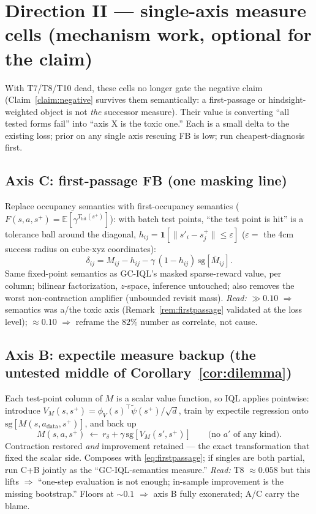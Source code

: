 \documentclass[11pt]{article}
\newcommand{\E}{\mathbb{E}}
\newcommand{\sg}{\mathrm{sg}}
\theoremstyle{definition}
\theoremstyle{remark}
\begin{document}
\section{Direction II --- single-axis measure cells (mechanism work, optional for the
claim)}\label{sec:direction2}

With T7/T8/T10 dead, these cells no longer gate the negative claim
(Claim~\ref{claim:negative} survives them semantically: a first-passage or
hindsight-weighted object is not \emph{the} successor measure). Their value is converting
``all tested forms fail'' into ``axis X is the toxic one.'' Each is a small delta to the
existing loss; prior on any single axis rescuing FB is low; run cheapest-diagnosis first.

\subsection{Axis C: first-passage FB (one masking line)}
Replace occupancy semantics with first-occupancy semantics
($F(s,a,s^+)=\E[\gamma^{T_{\mathrm{hit}}(s^+)}]$): with batch test points, ``the test point
is hit'' is a tolerance ball around the diagonal, $h_{ij}=\mathbf 1[\|s'_i-s^+_j\|\le
\varepsilon]$ ($\varepsilon=$ the 4cm success radius on cube-xyz coordinates):
\begin{equation}
\delta_{ij}=M_{ij}-h_{ij}-\gamma\,(1-h_{ij})\,\sg[\bar M_{ij}].
\label{eq:firstpassage}
\end{equation}
Same fixed-point semantics as GC-IQL's masked sparse-reward value, per column; bilinear
factorization, $z$-space, inference untouched; also removes the worst non-contraction
amplifier (unbounded revisit mass). \emph{Read:} $\gg0.10$ $\Rightarrow$ semantics was a/the
toxic axis (Remark~\ref{rem:firstpassage} validated at the loss level); $\approx0.10$
$\Rightarrow$ reframe the $82\%$ number as correlate, not cause.

\subsection{Axis B: expectile measure backup (the untested middle of
Corollary~\ref{cor:dilemma})}
Each test-point column of $M$ is a scalar value function, so IQL applies pointwise:
introduce $V_M(s,s^+)=\phi_V(s)^\top\tilde\psi(s^+)/\sqrt d$, train by expectile regression
onto $\sg[M(s,a_{\mathrm{data}},s^+)]$, and back up
\begin{equation}
M(s,a,s^+)\ \leftarrow\ r_\delta+\gamma\,\sg[V_M(s',s^+)]
\qquad\text{(no $a'$ of any kind)}.
\label{eq:expectilemeasure}
\end{equation}
Contraction restored \emph{and} improvement retained --- the exact transformation that fixed
the scalar side. Composes with \eqref{eq:firstpassage}; if singles are both partial, run
C{+}B jointly as the ``GC-IQL-semantics measure.'' \emph{Read:} T8 $\approx0.058$ but this
lifts $\Rightarrow$ ``one-step evaluation is not enough; in-sample improvement is the missing
bootstrap.'' Floors at $\sim0.1$ $\Rightarrow$ axis B fully exonerated; A/C carry the blame.
\end{document}
